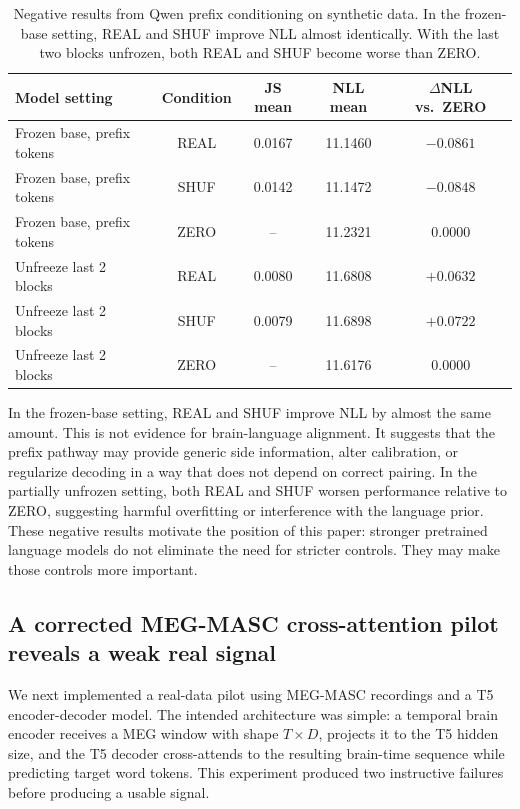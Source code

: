 \documentclass{article}
\begin{document}
\begin{table}[t]
\centering
\caption{Negative results from Qwen prefix conditioning on synthetic data. In the frozen-base setting, REAL and SHUF improve NLL almost identically. With the last two blocks unfrozen, both REAL and SHUF become worse than ZERO.}
\label{tab:qwen_negative}
\begin{tabular}{lcccc}
\toprule
Model setting & Condition & JS mean & NLL mean & $\Delta$NLL vs.\ ZERO \\
\midrule
Frozen base, prefix tokens & REAL & 0.0167 & 11.1460 & $-0.0861$ \\
Frozen base, prefix tokens & SHUF & 0.0142 & 11.1472 & $-0.0848$ \\
Frozen base, prefix tokens & ZERO & --     & 11.2321 & $0.0000$ \\
\midrule
Unfreeze last 2 blocks & REAL & 0.0080 & 11.6808 & $+0.0632$ \\
Unfreeze last 2 blocks & SHUF & 0.0079 & 11.6898 & $+0.0722$ \\
Unfreeze last 2 blocks & ZERO & --     & 11.6176 & $0.0000$ \\
\bottomrule
\end{tabular}
\end{table}

In the frozen-base setting, REAL and SHUF improve NLL by almost the same amount.
This is not evidence for brain-language alignment.
It suggests that the prefix pathway may provide generic side information, alter calibration, or regularize decoding in a way that does not depend on correct pairing.
In the partially unfrozen setting, both REAL and SHUF worsen performance relative to ZERO, suggesting harmful overfitting or interference with the language prior.
These negative results motivate the position of this paper: stronger pretrained language models do not eliminate the need for stricter controls.
They may make those controls more important.

\subsection{A corrected MEG-MASC cross-attention pilot reveals a weak real signal}

We next implemented a real-data pilot using MEG-MASC recordings and a T5 encoder-decoder model.
The intended architecture was simple: a temporal brain encoder receives a MEG window with shape $T \times D$, projects it to the T5 hidden size, and the T5 decoder cross-attends to the resulting brain-time sequence while predicting target word tokens.
This experiment produced two instructive failures before producing a usable signal.
\end{document}
